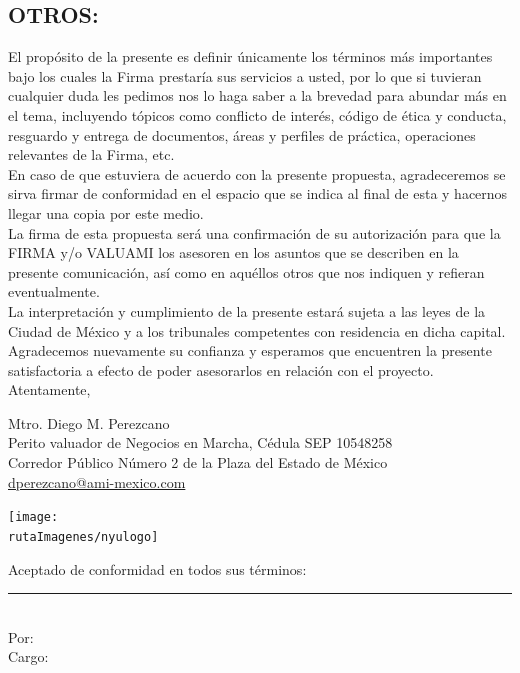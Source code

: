 \documentclass[5pt,letter]{article}
\begin{document}
  \begin{center}
 \section{OTROS:}
 \end{center}
 
 El propósito de la presente es definir únicamente los términos más importantes bajo los cuales la Firma prestaría sus servicios a usted, por lo que si tuvieran cualquier duda les pedimos nos lo haga saber a la brevedad para abundar más en el tema, incluyendo tópicos como conflicto de interés, código de ética y conducta, resguardo y entrega de documentos, áreas y perfiles de práctica, operaciones relevantes de la Firma, etc.\\
 
En caso de que estuviera de acuerdo con la presente propuesta, agradeceremos se sirva firmar de conformidad en el espacio que se indica al final de esta y hacernos llegar una copia por este medio.\\
 
 La firma de esta propuesta será una confirmación de su autorización para que la FIRMA y/o VALUAMI los asesoren en los asuntos que se describen en la presente comunicación, así como en aquéllos otros que nos indiquen y refieran eventualmente.\\
 
 La interpretación y cumplimiento de la presente estará sujeta a las leyes de la Ciudad de México y a los tribunales competentes con residencia en dicha capital.\\
 
 Agradecemos nuevamente su confianza y esperamos que encuentren la presente satisfactoria a efecto de poder asesorarlos en relación con el proyecto.\\		
 
 Atentamente,\\
 
\begin{minipage}{.7\textwidth}
 \textcolor{principal}{Mtro. Diego M. Perezcano}\\
 Perito valuador de Negocios en Marcha, Cédula SEP 10548258\\
 Corredor Público Número 2 de la Plaza del Estado de México\\
 \url{dperezcano@ami-mexico.com}
 \end{minipage}
 
 \texttt{[image: \\rutaImagenes/nyulogo]}\\
 
 \begin{flushright}
\textcolor{principal}{Aceptado de conformidad en todos sus términos:}\\[10pt]

\rule{5cm}{1pt}\\
\textcolor{principal}{Por: \personaSolicitante}\\
\textcolor{principal}{Cargo: \caracterSolicitante}

 \end{flushright}
 
 
 
 
\end{document}
